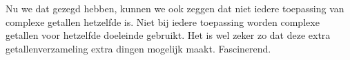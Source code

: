 \documentclass[11pt,fleqn]{book} %
\begin{document}
Nu we dat gezegd hebben, kunnen we ook zeggen dat niet iedere toepassing van complexe getallen hetzelfde is. Niet bij iedere toepassing worden complexe getallen voor hetzelfde doeleinde gebruikt. Het is wel zeker zo dat deze extra getallenverzameling extra dingen mogelijk maakt. Fascinerend.



\end{document}
